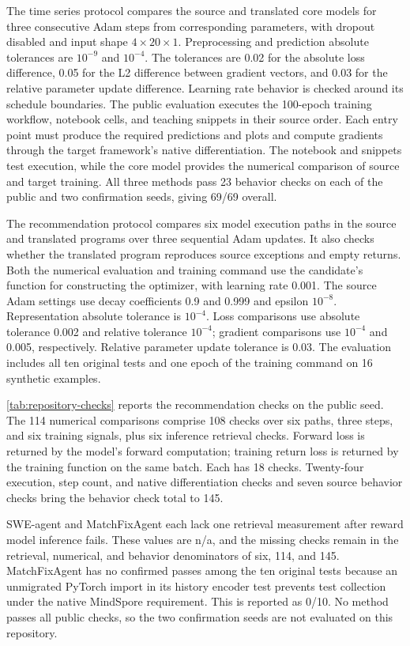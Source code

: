 \documentclass{article}
\begin{document}
The time series protocol compares the source and translated core models for three consecutive Adam steps from corresponding parameters, with dropout disabled and input shape $4\times20\times1$. Preprocessing and prediction absolute tolerances are $10^{-9}$ and $10^{-4}$. The tolerances are 0.02 for the absolute loss difference, 0.05 for the L2 difference between gradient vectors, and 0.03 for the relative parameter update difference. Learning rate behavior is checked around its schedule boundaries. The public evaluation executes the 100-epoch training workflow, notebook cells, and teaching snippets in their source order. Each entry point must produce the required predictions and plots and compute gradients through the target framework's native differentiation. The notebook and snippets test execution, while the core model provides the numerical comparison of source and target training. All three methods pass 23 behavior checks on each of the public and two confirmation seeds, giving 69/69 overall.

The recommendation protocol compares six model execution paths in the source and translated programs over three sequential Adam updates. It also checks whether the translated program reproduces source exceptions and empty returns. Both the numerical evaluation and training command use the candidate's function for constructing the optimizer, with learning rate 0.001. The source Adam settings use decay coefficients 0.9 and 0.999 and epsilon $10^{-8}$. Representation absolute tolerance is $10^{-4}$. Loss comparisons use absolute tolerance 0.002 and relative tolerance $10^{-4}$; gradient comparisons use $10^{-4}$ and 0.005, respectively. Relative parameter update tolerance is 0.03. The evaluation includes all ten original tests and one epoch of the training command on 16 synthetic examples.

\cref{tab:repository-checks} reports the recommendation checks on the public seed. The 114 numerical comparisons comprise 108 checks over six paths, three steps, and six training signals, plus six inference retrieval checks. Forward loss is returned by the model's forward computation; training return loss is returned by the training function on the same batch. Each has 18 checks. Twenty-four execution, step count, and native differentiation checks and seven source behavior checks bring the behavior check total to 145.

SWE-agent and MatchFixAgent each lack one retrieval measurement after reward model inference fails. These values are n/a, and the missing checks remain in the retrieval, numerical, and behavior denominators of six, 114, and 145. MatchFixAgent has no confirmed passes among the ten original tests because an unmigrated PyTorch import in its history encoder test prevents test collection under the native MindSpore requirement. This is reported as 0/10. No method passes all public checks, so the two confirmation seeds are not evaluated on this repository.
\end{document}
